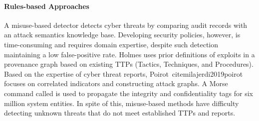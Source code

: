 \paragraph{Rules-based Approaches}
A misuse-based detector detects cyber threats by comparing audit records with an attack semantics knowledge base.
Developing security policies, however, is time-consuming and requires domain expertise, despite such detection maintaining a low false-positive rate.
Holmes \cite{milajerdi2019holmes} uses prior definitions of exploits in a provenance graph based on existing TTPs (Tactics, Techniques, and Procedures).
Based on the expertise of cyber threat reports, Poirot\
cite{milajerdi2019poirot} focuses on correlated indicators and constructing attack graphs.
A Morse command called \cite{hossain2020combating} is used to propagate the integrity and confidentiality tags for six million system entities.
In spite of this, misuse-based methods have difficulty detecting unknown threats that do not meet established TTPs and reports.


%





